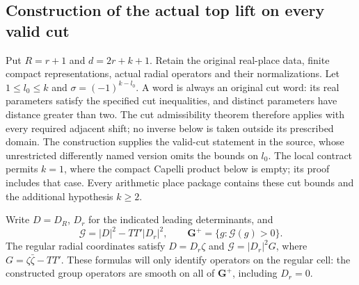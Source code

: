 \subsection{Construction of the actual top lift on every valid cut}
\label{actual-top-lift}

Put $R=r+1$ and $d=2r+k+1$.  Retain the original real-place data,
finite compact representations, actual radial operators and their
normalizations.  Let $1\le l_0\le k$ and
$\sigma=(-1)^{k-l_0}$.  A word is always an original cut word:
its real parameters satisfy the specified cut inequalities, and
distinct parameters have distance greater than two.  The cut
admissibility theorem therefore applies with every required adjacent
shift; no inverse below is taken outside its prescribed domain.
The construction supplies the valid-cut statement in the source,
whose unrestricted differently named version omits the bounds on
$l_0$.  The local contract permits $k=1$, where the compact
Capelli product below is empty; its proof includes that case.
Every arithmetic place package contains these cut bounds and
the additional hypothesis $k\ge2$.\cite{top-lift-contract-source}

Write $D=D_R$, $D_r$ for the indicated leading determinants, and
\[
 \mathcal G=|D|^2-TT'|D_r|^2,\qquad
 \mathbf G^+=\{g:\mathcal G(g)>0\}.
\]
The regular radial coordinates satisfy
$D=D_r\zeta$ and $\mathcal G=|D_r|^2G$, where
$G=\zeta\bar\zeta-TT'$.  These formulas will only identify
operators on the regular cell: the constructed group operators
are smooth on all of $\mathbf G^+$, including $D_r=0$.

